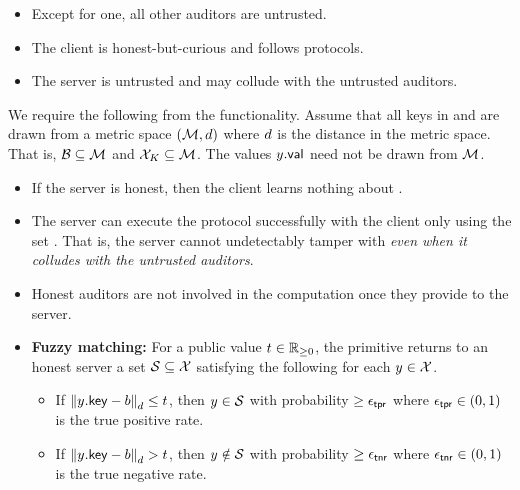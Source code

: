 \begin{itemize}
	\item Except for one, all other auditors are untrusted.
	\item The client is honest-but-curious and follows protocols.
	\item The server is untrusted and may collude with the untrusted auditors. 
\end{itemize}


%
We require the following from the \dPSI functionality. Assume that all
keys in \blocklist and \cInputSet are drawn from a metric space
$(\metricSpace, \distance)$ where $\distance$ is the distance in the
metric space. That is, $\blocklist \subseteq \metricSpace$ and
$\cInputKeySet \subseteq \metricSpace$.  The values
$\genericCInputElmt.\valueLabel$ need not be drawn from
$\metricSpace$.

\begin{itemize}
	\item If the server is honest, then the client learns nothing
          about \blocklist.
	\item The server can execute the protocol successfully with
          the client only using the set \blocklist.  That is, the
          server cannot undetectably tamper with \blocklist
          \textit{even when it colludes with the untrusted auditors}.
	\item Honest auditors are not involved in the computation once
          they provide \blocklist to the server.
	\item \textbf{Fuzzy matching:} For a public value $t
          \in \mathbb{R}_{\ge 0}$, the primitive returns to an honest
          server a set $\genericSetVar \subseteq \cInputSet$
          satisfying the following for each $\genericCInputElmt\in
          \cInputSet$.
	  \begin{itemize}
	  \item If
            $\distanceNotation[\distance][\genericCInputElmt.\keyLabel][\genericBlocklistElmt]
            \leq \threshold$, then $\genericCInputElmt \in
            \genericSetVar$ with probability $\ge \epsilon_\mathsf{tpr}$ where $\epsilon_\mathsf{tpr}
            \in (0,1)$ is the true positive rate.
	  \item If
            $\distanceNotation[\distance][\genericCInputElmt.\keyLabel][\genericBlocklistElmt]
            > \threshold$, then $\genericCInputElmt \notin
            \genericSetVar$ with probability $\ge \epsilon_\mathsf{tnr}$ where $\epsilon_\mathsf{tnr}
            \in (0,1)$ is the true negative rate.
	  \end{itemize}
\end{itemize}
\fi


